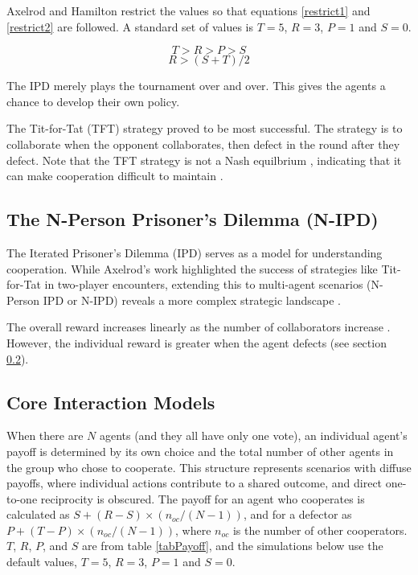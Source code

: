 \documentclass[]{llncs} %
\begin{document}
Axelrod and Hamilton restrict the values so that equations \ref {restrict1}
and \ref {restrict2} are followed.  A standard set of values is $T=5$, $R=3$,
$P=1$ and $S=0$.

\begin{equation}\label{restrict1}
T > R > P > S 
\end{equation}
\begin{equation}\label{restrict2}
R > (S + T) / 2
\end{equation}

The IPD merely plays the tournament over and over.  This gives the agents
a chance to develop their own policy.

The Tit-for-Tat (TFT) strategy proved to be most successful.  The
strategy is to collaborate when the opponent collaborates, then
defect in the round after they defect.  Note that the TFT strategy
is not a Nash equilbrium \cite {Nash}, indicating that it can make
cooperation difficult to maintain \cite {Holt}.

\subsection{The N-Person Prisoner's Dilemma (N-IPD)}

The Iterated Prisoner's Dilemma (IPD) serves as a model for
understanding cooperation. While Axelrod's work highlighted the
success of strategies like Tit-for-Tat in two-player encounters,
extending this to multi-agent scenarios (N-Person IPD or N-IPD)
reveals a more complex strategic landscape \cite {Weil}.

The overall reward increases linearly as the number of collaborators
increase \cite {Archetti}.  However, the individual reward
is greater when the agent defects (see section \ref {secCore}).  

\subsection{Core Interaction Models}
\label {secCore}
When there are $N$ agents (and they all have only one vote), 
an individual agent's payoff is determined by its
own choice and the total number of other agents in the group who
chose to cooperate. This structure represents scenarios with diffuse
payoffs, where individual actions contribute to a shared outcome, and
direct one-to-one reciprocity is obscured. The payoff for an agent who
cooperates is calculated as $S + (R - S) \times (n_{oc} / (N - 1))$,
and for a defector as $P + (T - P) \times (n_{oc} / (N - 1))$, where
$n_{oc}$ is the number of other cooperators. $T$, $R$, $P$, and $S$ are
from table \ref {tabPayoff}, and the simulations below use the default values,
$T=5$, $R=3$, $P=1$ and $S=0$.
\end{document}
